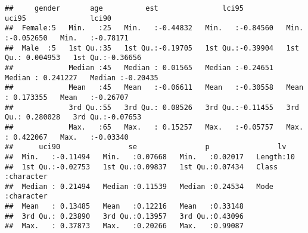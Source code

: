 \documentclass[
]{article}
\begin{document}
\begin{verbatim}
##     gender       age          est               lci95              uci95               lci90         
##  Female:5   Min.   :25   Min.   :-0.44832   Min.   :-0.84560   Min.   :-0.052650   Min.   :-0.78171  
##  Male  :5   1st Qu.:35   1st Qu.:-0.19705   1st Qu.:-0.39904   1st Qu.: 0.004953   1st Qu.:-0.36656  
##             Median :45   Median : 0.01565   Median :-0.24651   Median : 0.241227   Median :-0.20435  
##             Mean   :45   Mean   :-0.06611   Mean   :-0.30558   Mean   : 0.173355   Mean   :-0.26707  
##             3rd Qu.:55   3rd Qu.: 0.08526   3rd Qu.:-0.11455   3rd Qu.: 0.280028   3rd Qu.:-0.07653  
##             Max.   :65   Max.   : 0.15257   Max.   :-0.05757   Max.   : 0.422067   Max.   :-0.03340  
##      uci90                se                p                lv           
##  Min.   :-0.11494   Min.   :0.07668   Min.   :0.02017   Length:10         
##  1st Qu.:-0.02753   1st Qu.:0.09837   1st Qu.:0.07434   Class :character  
##  Median : 0.21494   Median :0.11539   Median :0.24534   Mode  :character  
##  Mean   : 0.13485   Mean   :0.12216   Mean   :0.33148                     
##  3rd Qu.: 0.23890   3rd Qu.:0.13957   3rd Qu.:0.43096                     
##  Max.   : 0.37873   Max.   :0.20266   Max.   :0.99087
\end{verbatim}
\end{document}
